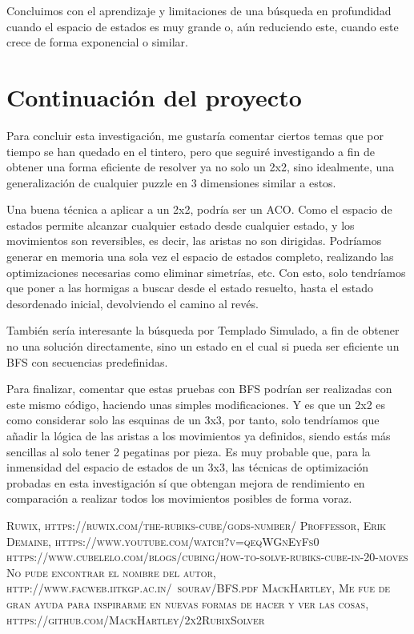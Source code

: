 \documentclass[11pt]{article}
\begin{document}
Concluimos con el aprendizaje y limitaciones de una búsqueda en profundidad cuando el espacio de estados es muy grande o, aún reduciendo este, cuando este crece de forma exponencial o similar. 

\section{Continuación del proyecto}

Para concluir esta investigación, me gustaría comentar ciertos temas que por tiempo se han quedado en el tintero, pero que seguiré investigando a fin de obtener una forma eficiente de resolver ya no solo un 2x2, sino idealmente, una generalización de cualquier puzzle en 3 dimensiones similar a estos.

Una buena técnica a aplicar a un 2x2, podría ser un ACO. Como el espacio de estados permite alcanzar cualquier estado desde cualquier estado, y los movimientos son reversibles, es decir, las aristas no son dirigidas. Podríamos generar en memoria una sola vez el espacio de estados completo, realizando las optimizaciones necesarias como eliminar simetrías, etc. 
Con esto, solo tendríamos que poner a las hormigas a buscar desde el estado resuelto, hasta el estado desordenado inicial, devolviendo el camino al revés.
\newline

También sería interesante la búsqueda por Templado Simulado, a fin de obtener no una solución directamente, sino un estado en el cual si pueda ser eficiente un BFS con secuencias predefinidas.
\newline

Para finalizar, comentar que estas pruebas con BFS podrían ser realizadas con este mismo código, haciendo unas simples modificaciones. Y es que un 2x2 es como considerar solo las esquinas de un 3x3, por tanto, solo tendríamos que añadir la lógica de las aristas a los movimientos ya definidos, siendo estás más sencillas al solo tener 2 pegatinas por pieza. Es muy probable que, para la inmensidad del espacio de estados de un 3x3, las técnicas de optimización probadas en esta investigación sí que obtengan mejora de rendimiento en comparación a realizar todos los movimientos posibles de forma voraz.

\pagebreak
\begin{thebibliography}{X}
	 \textsc{Ruwix}, \textsc{https://ruwix.com/the-rubiks-cube/gods-number/}
	 \textsc{Proffessor, Erik Demaine}, \textsc{https://www.youtube.com/watch?v=qeqWGnEyFs0}
	 \textsc{https://www.cubelelo.com/blogs/cubing/how-to-solve-rubiks-cube-in-20-moves}
	 \textsc{No pude encontrar el nombre del autor}, \textsc{http://www.facweb.iitkgp.ac.in/~sourav/BFS.pdf}
	 \textsc{MackHartley}, \textsc{Me fue de gran ayuda para inspirarme en nuevas formas de hacer y ver las cosas}, \textsc{https://github.com/MackHartley/2x2RubixSolver}
\end{thebibliography}
\end{document}
